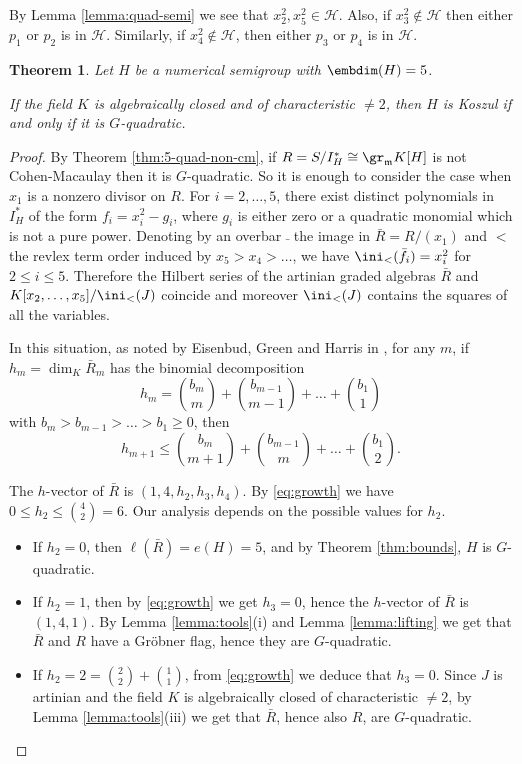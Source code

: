 \documentclass[12pt]{amsart}
\def\frk{\mathfrak}               %
\def\mm{{\frk m}}
\newtheorem{Theorem}{Theorem}[section]
\begin{document}
By Lemma \ref{lemma:quad-semi} we see that $x_2^2, x_5^2 \in  \mathcal{H}$.  Also, if $x_3^2\notin \mathcal{H}$ then either $p_1$ or $p_2$ is in $\mathcal{H}$. 
Similarly, if $x_4^2\notin \mathcal{H}$, then either $p_3$ or $p_4$ is in $\mathcal{H}$. 
 

\begin{Theorem}
\label{thm:5semi-koszul}
Let $H$ be a   numerical semigroup with  $\embdim(H) =5$. 

If the field $K$ is algebraically closed and of characteristic $\neq 2$, then $H$ is Koszul if and only if it is $G$-quadratic.
\end{Theorem}

\begin{proof}
By Theorem \ref{thm:5-quad-non-cm}, if $R=S/I_H^*\cong \gr_\mm K[H]$ is not Cohen-Macaulay then it is $G$-quadratic. 
So it is enough to consider the case when $x_1$ is a nonzero divisor on $R$. 
For $i=2,\dots, 5$, there exist distinct polynomials in $I_H^*$ of the form $f_i= x_i^2-g_i$, where $g_i$ is either zero or a quadratic monomial which is not a pure power. 
Denoting by an overbar $\bar{}$ the image in $\bar{R}=R/(x_1)$ and $<$ the revlex term order induced by $x_5>x_4>\dots$, we have $\ini_<(\bar{f_i})=x_i^2$ for $2\leq i\leq 5$. 
Therefore the Hilbert series of the artinian  graded algebras $\bar{R}$ and $K[x_2,\dots, x_5]/\ini_<(J)$ coincide and  moreover $\ini_<(J)$ contains the squares of all the variables. 
 
In this situation, as noted by Eisenbud, Green and Harris in \cite[Section 4]{EGH-highCastelnuovo}, for any $m$,  if  $h_m=\dim_K \bar{R}_m$ has the binomial decomposition
$$
h_m=  \binom{b_m}{m}+ \binom{b_{m-1}}{m-1}+\dots + \binom{b_1}{1}
$$ 
with $b_m> b_{m-1} > \dots > b_1 \geq 0$, then 
\begin{equation}
\label{eq:growth}
h_{m+1} \leq \binom{b_m}{m+1}+ \binom{b_{m-1}}{m}+\dots + \binom{b_1}{2}.
\end{equation}


The $h$-vector of $\bar{R}$ is $(1, 4, h_2, h_3, h_4)$. By \eqref{eq:growth} we have $0\leq h_2 \leq \binom{4}{2}=6$. 
Our analysis depends on the possible values for $h_2$.
\begin{itemize}
\item
If $h_2=0$, then $\ell(\bar{R})=e(H)=5$, and by Theorem \ref{thm:bounds}, $H$ is $G$-quadratic.

\item
If $h_2=1$, then by \eqref{eq:growth} we get $h_3=0$, hence the $h$-vector of $\bar{R}$ is $(1,4,1)$. 
By Lemma \ref{lemma:tools}(i) and Lemma \ref{lemma:lifting} we get that $\bar{R}$ and $R$ have a Gr\"obner flag, hence they are $G$-quadratic.
\item
If $h_2=2=\binom{2}{2}+ \binom{1}{1}$, from \eqref{eq:growth} we deduce that $h_3=0$. 
  Since $J$ is artinian and the field $K$ is algebraically closed of characteristic $\neq 2$, by Lemma \ref{lemma:tools}(iii) we get that $\bar{R}$, hence also $R$, are $G$-quadratic.


\end{itemize}
\end{proof}
\end{document}

